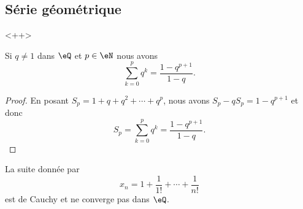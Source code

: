\subsection{Série géométrique}
<++>

\begin{lemma}   \label{LEMooOTVUooImvusn}
	Si \( q\neq 1\) dans \( \eQ\) et \( p\in \eN\) nous avons
	\begin{equation}
		\sum_{k=0}^pq^k=\frac{ 1-q^{p+1} }{ 1-q }.
	\end{equation}
\end{lemma}

\begin{proof}
	En posant \( S_p=1+q+q^2+\cdots +q^{p}\), nous avons \( S_p-qS_p=1-q^{p+1}\) et donc
	\begin{equation}
		S_p=\sum_{k=0}^pq^k=\frac{ 1-q^{p+1} }{ 1-q }.
	\end{equation}
\end{proof}

\begin{proposition}		\label{PROPooLBRCooBtJqwt}
	La suite donnée par
	\begin{equation}
		x_n=1+\frac{ 1 }{ 1! }+\cdots +\frac{1}{ n! }
	\end{equation}
	est de Cauchy et ne converge pas dans \( \eQ\).
\end{proposition}

